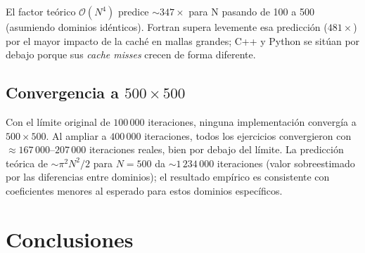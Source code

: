 \documentclass[12pt, a4paper]{article}
\begin{document}
El factor teórico $\mathcal{O}(N^4)$ predice $\sim347\times$ para N pasando de
100 a 500 (asumiendo dominios idénticos). Fortran supera levemente esa
predicción ($481\times$) por el mayor impacto de la caché en mallas grandes;
C++ y Python se sitúan por debajo porque sus \emph{cache misses} crecen de
forma diferente.

\subsection{Convergencia a $500\times500$}

Con el límite original de $100\,000$ iteraciones, ninguna implementación
convergía a $500\times500$. Al ampliar a $400\,000$ iteraciones, todos los
ejercicios convergieron con $\approx167\,000$--$207\,000$ iteraciones reales,
bien por debajo del límite. La predicción teórica de $\sim\pi^2 N^2/2$ para
$N=500$ da $\sim1\,234\,000$ iteraciones (valor sobreestimado por las
diferencias entre dominios); el resultado empírico es consistente con
coeficientes menores al esperado para estos dominios específicos.

\section{Conclusiones}
\end{document}
